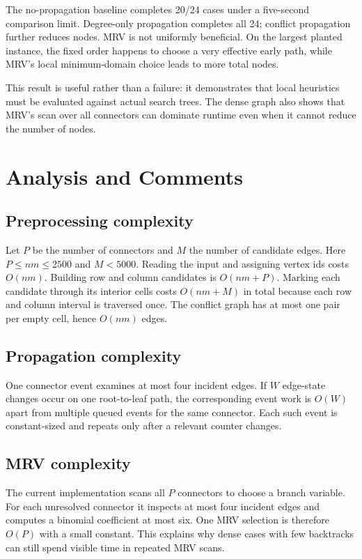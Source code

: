 \documentclass[11pt,a4paper,oneside]{article}
\begin{document}
The no-propagation baseline completes 20/24 cases under a five-second comparison
limit. Degree-only propagation completes all 24; conflict propagation further
reduces nodes. MRV is not uniformly beneficial. On the largest planted instance,
the fixed order happens to choose a very effective early path, while MRV's local
minimum-domain choice leads to more total nodes.

This result is useful rather than a failure: it demonstrates that local
heuristics must be evaluated against actual search trees. The dense graph also
shows that MRV's scan over all connectors can dominate runtime even when it
cannot reduce the number of nodes.

\section{Analysis and Comments}

\subsection{Preprocessing complexity}

Let $P$ be the number of connectors and $M$ the number of candidate edges. Here
$P\le nm\le2500$ and $M<5000$. Reading the input and assigning vertex ids costs
$O(nm)$. Building row and column candidates is $O(nm+P)$. Marking each candidate
through its interior cells costs $O(nm+M)$ in total because each row and column
interval is traversed once. The conflict graph has at most one pair per empty
cell, hence $O(nm)$ edges.

\subsection{Propagation complexity}

One connector event examines at most four incident edges. If $W$ edge-state
changes occur on one root-to-leaf path, the corresponding event work is $O(W)$
apart from multiple queued events for the same connector. Each such event is
constant-sized and repeats only after a relevant counter changes.

\subsection{MRV complexity}

The current implementation scans all $P$ connectors to choose a branch variable.
For each unresolved connector it inspects at most four incident edges and
computes a binomial coefficient at most six. One MRV selection is therefore
$O(P)$ with a small constant. This explains why dense cases with few backtracks
can still spend visible time in repeated MRV scans.
\end{document}

